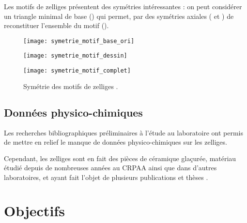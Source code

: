 Les motifs de zelliges présentent des symétries intéressantes : on 
peut considérer un triangle minimal de base () 
qui permet, par des symétries axiales ( et 
) de reconstituer l'ensemble du motif 
().


\begin{figure}[htb]
  \begin{minipage}[b]{0.45\textwidth}
    \centerfloat
    \texttt{[image: symetrie\_motif\_base\_ori]}
  \end{minipage}%

  \bigskip

  \begin{minipage}[b]{0.45\textwidth}
    \centerfloat
    \texttt{[image: symetrie\_motif\_dessin]}
  \end{minipage}%
  \quad
  \begin{minipage}[b]{0.45\textwidth}
    \centerfloat
    \texttt{[image: symetrie\_motif\_complet]}
  \end{minipage}
  \caption{Symétrie des motifs de zelliges \autocite{Castera_1996}.}
  \label{fig:symetrie}
\end{figure}

\section{Données physico-chimiques}

Les recherches bibliographiques préliminaires à l'étude au laboratoire 
ont permis de mettre en relief le manque de données physico-chimiques 
sur les zelliges.

Cependant, les zelliges sont en fait des pièces de céramique glaçurée, 
matériau étudié depuis de nombreuses années au CRPAA ainsi que dans 
d'autres laboratoires, et ayant fait l'objet de plusieurs publications 
et thèses 
\autocite{Rafaillac_1994}.

\chapter{Objectifs}

